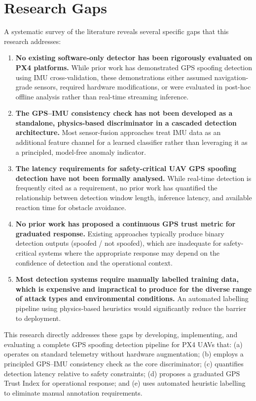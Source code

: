 \section{Research Gaps}

A systematic survey of the literature reveals several specific gaps that this research addresses:

\begin{enumerate}
    \item \textbf{No existing software-only detector has been rigorously evaluated on PX4 platforms.} While prior work has demonstrated GPS spoofing detection using IMU cross-validation, these demonstrations either assumed navigation-grade sensors, required hardware modifications, or were evaluated in post-hoc offline analysis rather than real-time streaming inference.
    \item \textbf{The GPS--IMU consistency check has not been developed as a standalone, physics-based discriminator in a cascaded detection architecture.} Most sensor-fusion approaches treat IMU data as an additional feature channel for a learned classifier rather than leveraging it as a principled, model-free anomaly indicator.
    \item \textbf{The latency requirements for safety-critical UAV GPS spoofing detection have not been formally analysed.} While real-time detection is frequently cited as a requirement, no prior work has quantified the relationship between detection window length, inference latency, and available reaction time for obstacle avoidance.
    \item \textbf{No prior work has proposed a continuous GPS trust metric for graduated response.} Existing approaches typically produce binary detection outputs (spoofed / not spoofed), which are inadequate for safety-critical systems where the appropriate response may depend on the confidence of detection and the operational context.
    \item \textbf{Most detection systems require manually labelled training data, which is expensive and impractical to produce for the diverse range of attack types and environmental conditions.} An automated labelling pipeline using physics-based heuristics would significantly reduce the barrier to deployment.
\end{enumerate}

This research directly addresses these gaps by developing, implementing, and evaluating a complete GPS spoofing detection pipeline for PX4 UAVs that: (a) operates on standard telemetry without hardware augmentation; (b) employs a principled GPS--IMU consistency check as the core discriminator; (c) quantifies detection latency relative to safety constraints; (d) proposes a graduated GPS Trust Index for operational response; and (e) uses automated heuristic labelling to eliminate manual annotation requirements.
